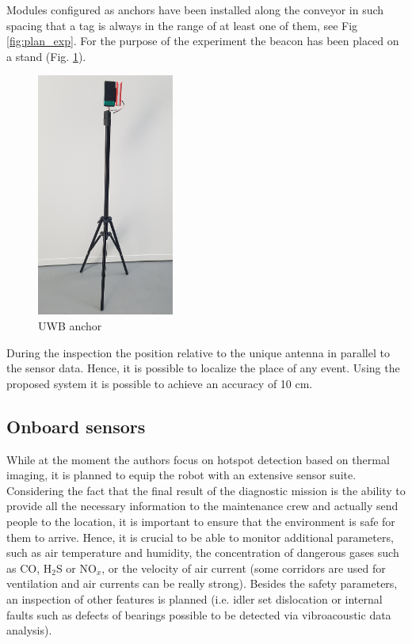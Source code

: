 \documentclass[3p,times,12pt]{elsarticle}
\begin{document}
Modules configured as anchors have been installed along the conveyor in such spacing that a tag is always in the range of at least one of them, see Fig \ref{fig:plan_exp}. For the purpose of the experiment the beacon has been placed on a stand (Fig. \ref{fig:UWB_antena}). 

\begin{figure}[ht!]
	\centering
	\includegraphics[width=0.4\textwidth]{gps.jpg}
	\caption{UWB anchor}
	\label{fig:UWB_antena}
\end{figure}
During the inspection the position relative to the unique antenna in parallel to the sensor data. Hence, it is possible to localize the place of any event. Using the proposed system it is possible to achieve an accuracy of 10 cm.


\subsection{Onboard sensors}

While at the moment the authors focus on hotspot detection based on thermal imaging, it is planned to equip the robot with an extensive sensor suite. Considering the fact that the final result of the diagnostic mission is the ability to provide all the necessary information to the maintenance crew and actually send people to the location, it is important to ensure that the environment is safe for them to arrive. Hence, it is crucial to be able to monitor additional parameters, such as air temperature and humidity, the concentration of dangerous gases such as CO, H$_2$S or NO$_x$, or the velocity of air current (some corridors are used for ventilation and air currents can be really strong). Besides the safety parameters, an inspection of other features is planned (i.e. idler set dislocation or internal faults such as defects of bearings possible to be detected via vibroacoustic data analysis). 
\end{document}
